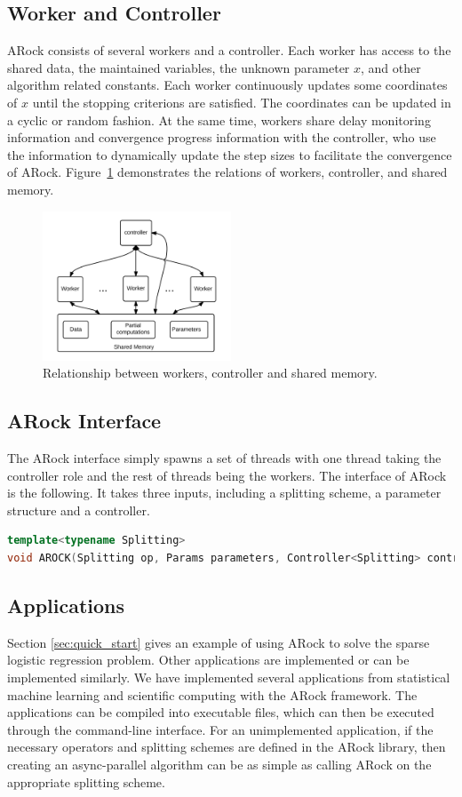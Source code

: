 \subsection{Worker and Controller}
ARock consists of several workers and a controller. Each worker has access to the shared data, the maintained variables, the unknown parameter $x$, and other algorithm related constants. Each worker continuously updates some coordinates of $x$ until the stopping criterions are satisfied. The coordinates can be updated in a cyclic or random fashion. At the same time, workers share delay monitoring information and convergence progress information with the controller, who use the information to dynamically update the step sizes to facilitate the convergence of ARock. Figure~\ref{fig:worker_controller} demonstrates the relations of workers, controller, and shared memory.  
\begin{figure}[!h]
      \centering
        \includegraphics[width=0.5\textwidth]{./figs/worker_controller.png}
      \caption{Relationship between workers, controller and shared memory.}
        \label{fig:worker_controller}
\end{figure}

\subsection{ARock Interface}
The ARock interface simply spawns a set of threads with one thread taking the controller role and the rest of threads being the workers. The interface of ARock is the following. It takes three inputs, including a splitting scheme, a parameter structure and a controller.
\begin{lstlisting}[language=c++]
template<typename Splitting>
void AROCK(Splitting op, Params parameters, Controller<Splitting> controller);
\end{lstlisting}


\subsection{Applications}
Section \ref{sec:quick_start} gives an example of using ARock to solve the sparse logistic regression problem. Other applications are implemented or can be implemented similarly. We have implemented several applications from statistical machine learning and scientific computing with the ARock framework. The applications can be compiled into executable files, which can then be executed through the command-line interface. For an unimplemented application, if the necessary operators and splitting schemes are defined in the ARock library, then creating an async-parallel algorithm can be as simple as calling ARock on the appropriate splitting scheme. 


